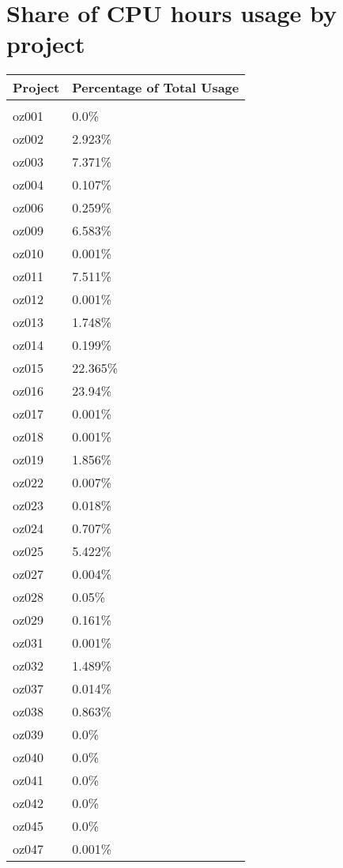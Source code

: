 \documentclass{article}%
\begin{document}
\section{Share of CPU hours usage by project}%

%
\begin{longtabu}{X[l] X[r]}%
\textbf{Project}&\textbf{Percentage of Total Usage}\\%
\hline%
&\\%
oz001&0.0\%\\%
\hline%
oz002&2.923\%\\%
\hline%
oz003&7.371\%\\%
\hline%
oz004&0.107\%\\%
\hline%
oz006&0.259\%\\%
\hline%
oz009&6.583\%\\%
\hline%
oz010&0.001\%\\%
\hline%
oz011&7.511\%\\%
\hline%
oz012&0.001\%\\%
\hline%
oz013&1.748\%\\%
\hline%
oz014&0.199\%\\%
\hline%
oz015&22.365\%\\%
\hline%
oz016&23.94\%\\%
\hline%
oz017&0.001\%\\%
\hline%
oz018&0.001\%\\%
\hline%
oz019&1.856\%\\%
\hline%
oz022&0.007\%\\%
\hline%
oz023&0.018\%\\%
\hline%
oz024&0.707\%\\%
\hline%
oz025&5.422\%\\%
\hline%
oz027&0.004\%\\%
\hline%
oz028&0.05\%\\%
\hline%
oz029&0.161\%\\%
\hline%
oz031&0.001\%\\%
\hline%
oz032&1.489\%\\%
\hline%
oz037&0.014\%\\%
\hline%
oz038&0.863\%\\%
\hline%
oz039&0.0\%\\%
\hline%
oz040&0.0\%\\%
\hline%
oz041&0.0\%\\%
\hline%
oz042&0.0\%\\%
\hline%
oz045&0.0\%\\%
\hline%
oz047&0.001\%\\%
\hline%

\end{longtabu}
\end{document}
